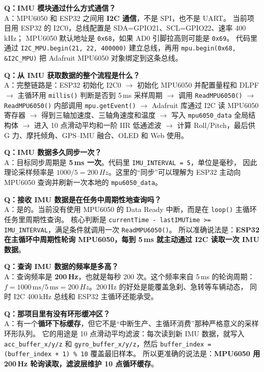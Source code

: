 \documentclass[UTF8,11pt,a4paper]{ctexart}
\begin{document}
\begin{followup}
\textbf{Q：IMU 模块通过什么方式通信？}\\
A：MPU6050 和 ESP32 之间用 \textbf{I2C 通信}，不是 SPI，也不是 UART。
当前项目用 ESP32 的 I2C0，总线配置是 SDA=GPIO21、SCL=GPIO22、速率 400\,kHz；
MPU6050 默认地址是 \texttt{0x68}，如果 AD0 引脚拉高则可能是 \texttt{0x69}。
代码里通过 \texttt{I2C\_MPU.begin(21, 22, 400000)} 建立总线，再用
\texttt{mpu.begin(0x68, \&I2C\_MPU)} 把 Adafruit MPU6050 对象绑定到这条总线。

\medskip
\textbf{Q：从 IMU 获取数据的整个流程是什么？}\\
A：完整链路是：ESP32 初始化 I2C0 $\to$ 初始化 MPU6050 并配置量程和 DLPF $\to$
主循环用 \texttt{millis()} 判断是否到 5\,ms 采样周期 $\to$ 调用 \texttt{ReadMPU6050()} $\to$
\texttt{ReadMPU6050()} 内部调用 \texttt{mpu.getEvent()} $\to$ Adafruit 库通过 I2C 读 MPU6050 寄存器 $\to$
得到三轴加速度、三轴角速度和温度 $\to$ 写入 \texttt{mpu6050\_data} 全局结构体 $\to$
进入 10 点滑动平均和一阶 IIR 低通滤波 $\to$ 计算 Roll/Pitch，最后供 G 力、摩托倾角、GPS--IMU 融合、OLED 和 Web 使用。

\medskip
\textbf{Q：IMU 数据多久同步一次？}\\
A：目标同步周期是 \textbf{5\,ms 一次}。代码里 \texttt{IMU\_INTERVAL = 5}，单位是毫秒，
因此理论采样频率是 $1000/5 = 200\,Hz$。这里的``同步''可以理解为 ESP32 主动向 MPU6050 查询并刷新一次本地的 \texttt{mpu6050\_data}。

\medskip
\textbf{Q：接收 IMU 数据是在任务中周期性地查询吗？}\\
A：是的。当前没有使用 MPU6050 的 Data Ready 中断，而是在 \texttt{loop()} 主循环任务里周期性查询。
核心判断是 \texttt{currentTime - lastIMUTime >= IMU\_INTERVAL}，满足条件就调用一次 \texttt{ReadMPU6050()}。
所以准确说法是：\textbf{ESP32 在主循环中周期性轮询 MPU6050，每到 5\,ms 就主动通过 I2C 读取一次 IMU 数据}。

\medskip
\textbf{Q：查询 IMU 数据的频率是多高？}\\
A：查询频率是 \textbf{200\,Hz}，也就是每秒 200 次。这个频率来自 5\,ms 的轮询周期：
$f = 1000\,\text{ms} / 5\,\text{ms} = 200\,Hz$。200\,Hz 的好处是能覆盖急刹、急转等车辆动态，
同时 I2C 400\,kHz 总线和 ESP32 主循环还能承受。

\medskip
\textbf{Q：那项目里有没有环形缓冲区？}\\
A：有一个\textbf{循环下标缓存}，但它不是``中断生产、主循环消费''那种严格意义的采样环形队列。
它的用途是 10 点滑动平均滤波：每次读到新 IMU 数据，就写入 \texttt{acc\_buffer\_x/y/z} 和
\texttt{gyro\_buffer\_x/y/z}，然后 \texttt{buffer\_index = (buffer\_index + 1) \% 10} 覆盖最旧样本。
所以更准确的说法是：\textbf{MPU6050 用 200\,Hz 轮询读取，滤波层维护 10 点循环缓存}。


\end{followup}
\end{document}
